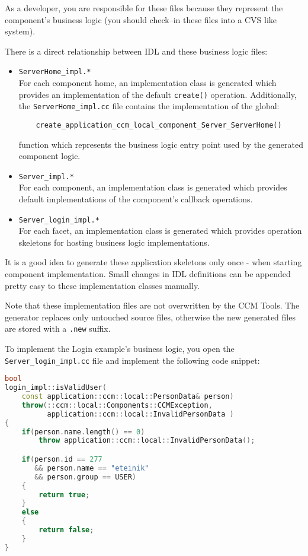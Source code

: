 As a developer, you are responsible for these files because they represent the
component's business logic (you should check--in these files into a CVS like system).

\vspace{3mm}
There is a direct relationship between IDL and these business logic files:
\begin{itemize}
	\item {\tt ServerHome\_impl.*}\\
	For each component home, an implementation class is generated which provides an
	implementation of the default {\tt create()} operation.
	Additionally, the {\tt ServerHome\_impl.cc} file contains the implementation of
	the global:
	\begin{verbatim}
    create_application_ccm_local_component_Server_ServerHome()
    \end{verbatim}
 	function which represents the business logic entry point used by the generated 
 	component logic. 

\item {\tt Server\_impl.*}\\
	For each component, an implementation class is generated which provides 
	default implementations of the component's callback operations.
	
\item {\tt Server\_login\_impl.*}\\
	For each facet, an implementation class is generated which provides operation
	skeletons for hosting business logic implementations.
\end{itemize}

It is a good idea to generate these application skeletons only once - when starting 
component implementation. 
Small changes in IDL definitions can be appended pretty easy to these
implementation classes manually.

 \vspace{3mm}
Note that these implementation files are not overwritten by the CCM Tools.
The generator replaces only untouched source files, otherwise the new
generated files are stored with a {\tt .new} suffix.

 \vspace{3mm}
To implement the Login example's business logic, you open the 
{\tt Server\_login\_impl.cc} file and implement the following code snippet:

\begin{footnotesize}
\begin{lstlisting}[language=C++]
bool
login_impl::isValidUser(
    const application::ccm::local::PersonData& person)
    throw(::ccm::local::Components::CCMException,
          application::ccm::local::InvalidPersonData )
{
    if(person.name.length() == 0)
        throw application::ccm::local::InvalidPersonData();

    if(person.id == 277 
       && person.name == "eteinik"
       && person.group == USER) 
    {
        return true;
    }
    else 
    {
        return false;
    }
}
\end{lstlisting}
\end{footnotesize}

